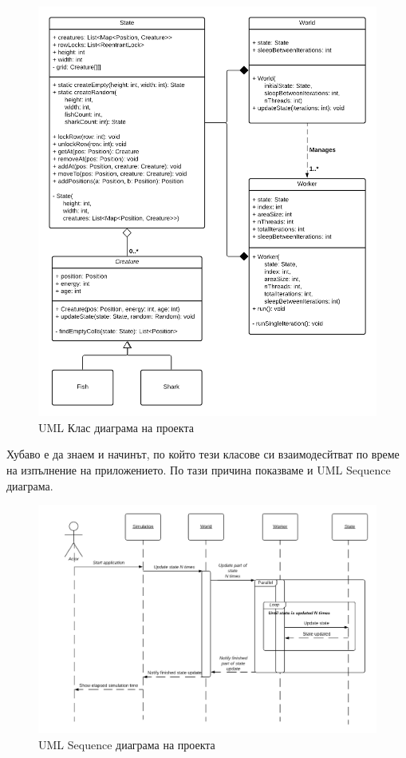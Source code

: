 \documentclass[12pt]{article}
\begin{document}
\begin{figure}[H]
	\centering
	\includegraphics[width=1.2\textwidth]{classes-uml.png}
	\caption{UML Клас диаграма на проекта}
\end{figure}

\newpage

Хубаво е да знаем и начинът, по който тези класове си взаимодесйтват по време на изпълнение на приложението.
По тази причина показваме и UML Sequence диаграма.

\begin{figure}[H]
	\hspace*{-3cm}
	\centering
	\includegraphics[width=1.3\textwidth]{sequence.png}
	\caption{UML Sequence диаграма на проекта}
\end{figure}
\end{document}
